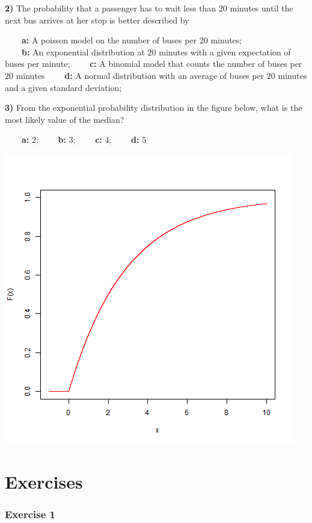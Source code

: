 \documentclass[
]{book}
\begin{document}
\textbf{2)} The probability that a passenger has to wait less than 20 minutes until the next bus arrives at her stop is better described by

\textbf{\(\qquad\)a:} A poisson model on the number of buses per 20 minutes;\\
\textbf{\(\qquad\)b:} An exponential distribution at 20 minutes with a given expectation of buses per minute;
\textbf{\(\qquad\)c:} A binomial model that counts the number of buses per 20 minutes
\textbf{\(\qquad\)d:} A normal distribution with an average of buses per 20 minutes and a given standard deviation;

\textbf{3)} From the exponential probability distribution in the figure below, what is the most likely value of the median?

\textbf{\(\qquad\)a:} \(2\); \textbf{\(\qquad\)b:} \(3\); \textbf{\(\qquad\)c:} \(4\); \textbf{\(\qquad\)d:} \(5\)

\includegraphics{./figures/exp.png}

\hypertarget{exercises-6}{%
\section{Exercises}\label{exercises-6}}

\hypertarget{exercise-1-5}{%
\subsubsection{Exercise 1}\label{exercise-1-5}}
\end{document}

